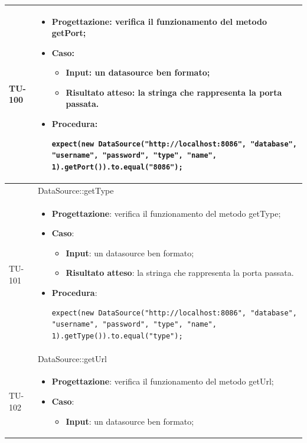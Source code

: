 \begin{longtable}{|C{1.5cm}|C{14.5cm}|}
\\ \hline
{TU-100} &
\begin{itemize}
	\item \textbf{Progettazione}: verifica il funzionamento del metodo getPort;
	\item \textbf{Caso}: 
	\begin{itemize}
		\item \textbf{Input}: un datasource ben formato;
		\item \textbf{Risultato atteso}: la stringa che rappresenta la porta passata.
	\end{itemize}
	\item \textbf{Procedura}:
	\begin{lstlisting}
expect(new DataSource("http://localhost:8086", "database", "username", "password", "type", "name", 1).getPort()).to.equal("8086");
	\end{lstlisting}
\end{itemize}\\
\hline
{} & DataSource::getType
\\ \hline
{TU-101} &
\begin{itemize}
	\item \textbf{Progettazione}: verifica il funzionamento del metodo getType;
	\item \textbf{Caso}: 
	\begin{itemize}
		\item \textbf{Input}: un datasource ben formato;
		\item \textbf{Risultato atteso}: la stringa che rappresenta la porta passata.
	\end{itemize}
	\item \textbf{Procedura}:
	\begin{lstlisting}
expect(new DataSource("http://localhost:8086", "database", "username", "password", "type", "name", 1).getType()).to.equal("type");
	\end{lstlisting}
\end{itemize}\\
\hline
{} & DataSource::getUrl
\\ \hline
{TU-102} &
\begin{itemize}
	\item \textbf{Progettazione}: verifica il funzionamento del metodo getUrl;
	\item \textbf{Caso}: 
	\begin{itemize}
		\item \textbf{Input}: un datasource ben formato;

\end{itemize}
\end{itemize}
\end{longtable}
